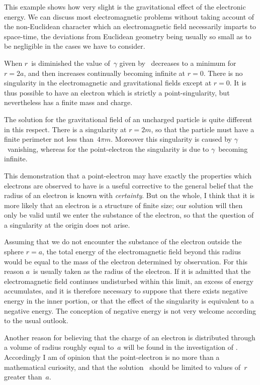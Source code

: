 \documentclass[12pt]{book}
\begin{document}
This example shows how very slight is the gravitational effect of the
electronic energy. We can discuss most electromagnetic problems without
taking account of the non\hyp{}Euclidean character which an electromagnetic field
necessarily imparts to space-time, the deviations from Euclidean geometry
being usually so small as to be negligible in the cases we have to consider.

When $r$~is diminished the value of~$\gamma$ given by~ decreases to a minimum
for $r = 2a$, and then increases continually becoming infinite at $r = 0$. There is
no singularity in the electromagnetic and gravitational fields except at $r = 0$.
It is thus possible to have an electron which is strictly a point\hyp{}singularity,
but nevertheless has a finite mass and charge.

The solution for the gravitational field of an uncharged particle is quite
different in this respect. There is a singularity at $r = 2m$, so that the particle
must have a finite perimeter not less than~$4\pi m$. Moreover this singularity is
caused by $\gamma$~vanishing, whereas for the point\hyp{}electron the singularity is due
%
to $\gamma$~becoming infinite.

This demonstration that a point\hyp{}electron may have exactly the properties
which electrons are observed to have is a useful corrective to the general belief
that the radius of an electron is known with \emph{certainty}. But on the whole,
I think that it is more likely that an electron is a structure of finite size; our
solution will then only be valid until we enter the substance of the electron,
so that the question of a singularity at the origin does not arise.

Assuming that we do not encounter the substance of the electron outside
the sphere $r = a$, the total energy of the electromagnetic field beyond this
radius would be equal to the mass of the electron determined by observation.
For this reason $a$~is usually taken as the radius of the electron. If it is
admitted that the electromagnetic field continues undisturbed within this
limit, an excess of energy accumulates, and it is therefore necessary to suppose
that there exists negative energy in the inner portion, or that the effect of
the singularity is equivalent to a negative energy. The conception of negative
energy is not very welcome according to the usual outlook.

Another reason for believing that the charge of an electron is distributed
through a volume of radius roughly equal to~$a$ will be found in the investigation
of . Accordingly I am of opinion that the point\hyp{}electron is no more
than a mathematical curiosity, and that the solution~ should be limited
to values of~$r$ greater than~$a$.
\end{document}
